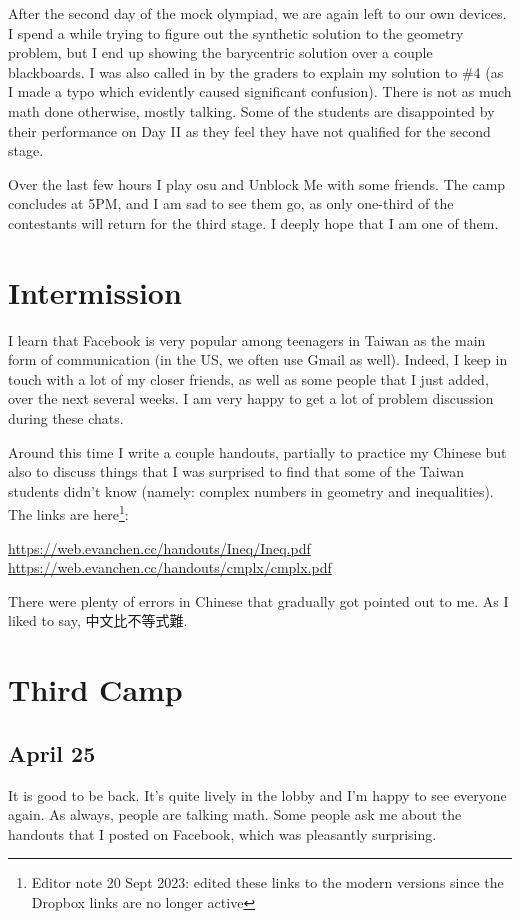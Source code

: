 \documentclass[11pt]{scrreprt}
\begin{document}
After the second day of the mock olympiad, we are again left to our own devices. I spend a while trying to figure out the synthetic solution to the geometry problem, but I end up showing the barycentric solution over a couple blackboards. I was also called in by the graders to explain my solution to \#4 (as I made a typo which evidently caused significant confusion). There is not as much math done otherwise, mostly talking. Some of the students are disappointed by their performance on Day II as they feel they have not qualified for the second stage.

Over the last few hours I play osu and Unblock Me with some friends. The camp concludes at 5PM, and I am sad to see them go, as only one-third of the contestants will return for the third stage. I deeply hope that I am one of them.


\section{Intermission}
I learn that Facebook is very popular among teenagers in Taiwan as the main form of communication (in the US, we often use Gmail as well).
Indeed, I keep in touch with a lot of my closer friends, as well as some people that I just added, over the next several weeks.
I am very happy to get a lot of problem discussion during these chats.

Around this time I write a couple handouts, partially to practice my Chinese but also to discuss things that I was surprised to find that some of the Taiwan students didn't know (namely: complex numbers in geometry and inequalities).
The links are here\footnote{Editor note 20 Sept 2023: edited these links to the modern
  versions since the Dropbox links are no longer active}:
\begin{itemize}
  \ii \url{https://web.evanchen.cc/handouts/Ineq/Ineq.pdf}
  \ii \url{https://web.evanchen.cc/handouts/cmplx/cmplx.pdf}
\end{itemize}
There were plenty of errors in Chinese that gradually got pointed out to me. As I liked to say, 中文比不等式難.

\section{Third Camp}
\subsection{April 25}
It is good to be back. It's quite lively in the lobby and I'm happy to see everyone again.
As always, people are talking math.
Some people ask me about the handouts that I posted on Facebook, which was pleasantly surprising.
\end{document}
